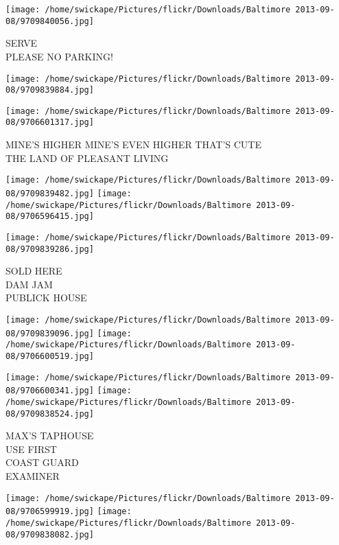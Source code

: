 \documentclass[10pt,letterpaper]{article}
\begin{document}
\vspace{0.25in}
\texttt{[image: /home/swickape/Pictures/flickr/Downloads/Baltimore 2013-09-08/9709840056.jpg]}

SERVE\\
PLEASE NO PARKING!\\
\pagebreak

\texttt{[image: /home/swickape/Pictures/flickr/Downloads/Baltimore 2013-09-08/9709839884.jpg]}

\vspace{0.25in}
\texttt{[image: /home/swickape/Pictures/flickr/Downloads/Baltimore 2013-09-08/9706601317.jpg]}

MINE'S HIGHER MINE'S EVEN HIGHER THAT'S CUTE\\
THE LAND OF PLEASANT LIVING\\
\pagebreak

\texttt{[image: /home/swickape/Pictures/flickr/Downloads/Baltimore 2013-09-08/9709839482.jpg]}
\texttt{[image: /home/swickape/Pictures/flickr/Downloads/Baltimore 2013-09-08/9706596415.jpg]}

\vspace{0.25in}
\texttt{[image: /home/swickape/Pictures/flickr/Downloads/Baltimore 2013-09-08/9709839286.jpg]}

SOLD HERE\\
DAM JAM\\
PUBLICK HOUSE\\
\pagebreak

\texttt{[image: /home/swickape/Pictures/flickr/Downloads/Baltimore 2013-09-08/9709839096.jpg]}
\texttt{[image: /home/swickape/Pictures/flickr/Downloads/Baltimore 2013-09-08/9706600519.jpg]}

\texttt{[image: /home/swickape/Pictures/flickr/Downloads/Baltimore 2013-09-08/9706600341.jpg]}
\texttt{[image: /home/swickape/Pictures/flickr/Downloads/Baltimore 2013-09-08/9709838524.jpg]}

MAX'S TAPHOUSE\\
USE FIRST\\
COAST GUARD\\
EXAMINER\\
\pagebreak

\texttt{[image: /home/swickape/Pictures/flickr/Downloads/Baltimore 2013-09-08/9706599919.jpg]}
\texttt{[image: /home/swickape/Pictures/flickr/Downloads/Baltimore 2013-09-08/9709838082.jpg]}
\end{document}
